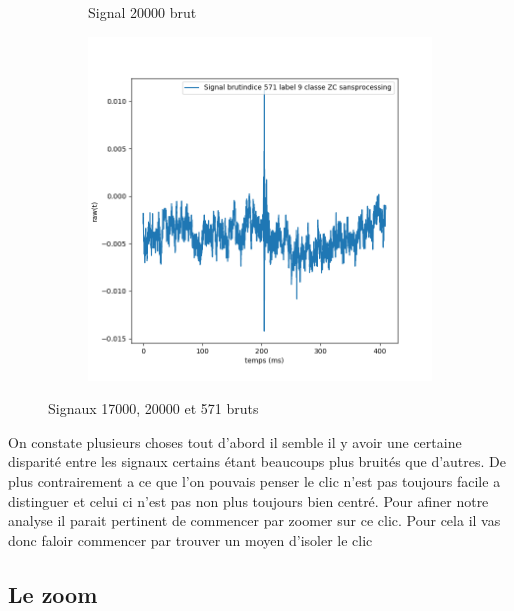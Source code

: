 \begin{figure}[!h]
\begin{subfigure}[b]{0.3\textwidth}
    \caption{Signal 20000 brut}
  \end{subfigure}
  \begin{subfigure}[b]{0.3\textwidth}
    \includegraphics[width=\textwidth]{./images/indice571Spectro1Dlabel9classeZCsansprocessingsanszoom.png}
  \end{subfigure}
  \caption{Signaux 17000, 20000 et 571 bruts}
\end{figure}

On constate plusieurs choses tout d'abord il semble il y avoir une certaine disparité entre les signaux certains étant beaucoups plus bruités que d'autres. De plus contrairement a ce que l'on pouvais penser le clic n'est pas toujours facile a distinguer et celui ci n'est pas non plus toujours bien centré. Pour afiner notre analyse il parait pertinent de commencer par zoomer sur ce clic.
Pour cela il vas donc faloir commencer par trouver un moyen d'isoler le clic

\hypertarget{Le-zoom}{%
\subsection{Le zoom}
\label{Le-zoom}}


